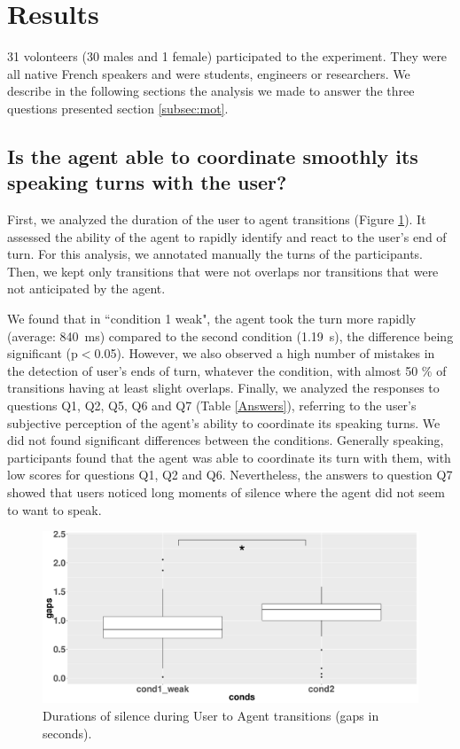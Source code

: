 \section{Results}

31 volonteers (30 males and 1 female) participated to the experiment. They were all native French speakers and were students, engineers or researchers. We describe in the following sections the analysis we made to answer the three questions presented section \ref{subsec:mot}.

\subsection{Is the agent able to coordinate smoothly its speaking turns with the user?}

First, we analyzed the duration of the user to agent transitions (Figure \ref{box_ua}). It assessed the ability of the agent to rapidly identify and react to the user's end of turn. For this analysis, we annotated manually the turns of the participants. Then, we kept only transitions that were not overlaps nor transitions that were not anticipated by the agent. 

We found that in ``condition 1 weak", the agent took the turn more rapidly (average: 840~ms) compared to the second condition (1.19~s), the difference being significant (p$<$0.05). However, we also observed a high number of mistakes in the detection of user's ends of turn, whatever the condition, with almost 50 \% of transitions having at least slight overlaps.  
Finally, we analyzed the responses to questions Q1, Q2, Q5, Q6 and Q7 (Table \ref{Answers}), referring to the user's subjective perception of the agent's ability to coordinate its speaking turns. We did not found significant differences between the conditions. Generally speaking, participants found that the agent was able to coordinate its turn with them, with low scores for questions Q1, Q2 and Q6. 
Nevertheless, the answers to question Q7 showed that users noticed long moments of silence where the agent did not seem to want to speak. 
 
\begin{figure}
\centering
\includegraphics[width=\linewidth]{figure/boxTransitionsUA.pdf}
\caption{Durations of silence during User to Agent transitions (gaps in seconds).}
\label{box_ua}
\end{figure}
  
